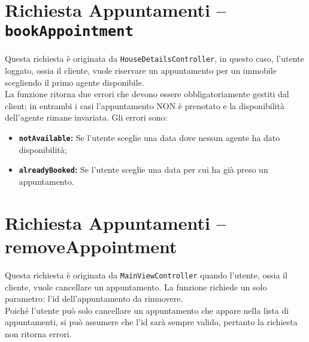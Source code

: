 \section{Richiesta Appuntamenti – \texttt{bookAppointment}}
\noindent Questa richiesta è originata da \texttt{HouseDetailsController}, in questo caso, l’utente loggato, ossia il cliente, vuole riservare un appuntamento per un immobile scegliendo il primo agente disponibile.\\
La funzione ritorna due errori che devono essere obbligatoriamente gestiti dal client; in entrambi i casi l’appuntamento NON è prenotato e la disponibilità dell’agente rimane invariata.
Gli errori sono:
\begin{itemize}
    \item \textbf{\texttt{notAvailable}:} Se l’utente sceglie una data dove nessun agente ha dato disponibilità;
    \item \textbf{\texttt{alreadyBooked}:} Se l’utente sceglie una data per cui ha già preso un appuntamento. 
\end{itemize}

\section{Richiesta Appuntamenti – removeAppointment}
\noindent Questa richiesta è originata da \texttt{MainViewController} quando l’utente, ossia il cliente, vuole cancellare un appuntamento. La funzione richiede un solo parametro: l’id dell’appuntamento da rimuovere.\\
Poiché l’utente può solo cancellare un appuntamento che appare nella lista di appuntamenti, si può assumere che l’id sarà sempre valido, pertanto la richiesta non ritorna errori.